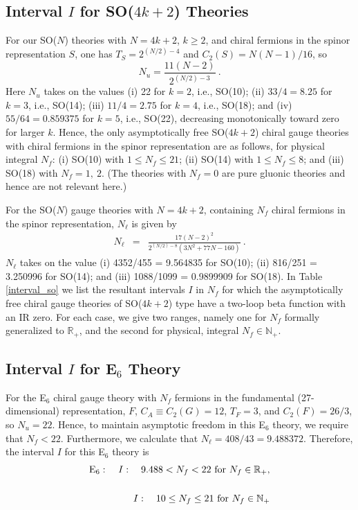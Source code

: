 \documentclass[prd,twocolumn,nofootinbib,amsfonts,amssymb]{revtex4}
\newcommand{\beq}{\begin{equation}}
\newcommand{\eeq}{\end{equation}}
\newcommand{\beqs}{\begin{eqnarray}}
\newcommand{\eeqs}{\end{eqnarray}}
\begin{document}

\subsection{Interval $I$ for SO($4k+2$) Theories} 

For our SO($N$) theories with $N=4k+2$, $k \ge 2$, and chiral fermions in the
spinor representation $S$, one has $T_S = 2^{(N/2)-4}$ and 
$C_2(S) = N(N-1)/16$, so 
%
\beq
N_u = \frac{11(N-2)}{2^{(N/2)-3}} \ . 
\label{nu}
\eeq
%
Here $N_u$ takes on the values (i) 22 for $k=2$, i.e., SO(10); (ii) $33/4=8.25$
for $k=3$, i.e., SO(14); (iii) $11/4=2.75$ for $k=4$, i.e., SO(18); and (iv)
$55/64=0.859375$ for $k=5$, i.e., SO(22), decreasing monotonically toward zero
for larger $k$.  Hence, the only asymptotically free SO($4k+2$) chiral gauge
theories with chiral fermions in the spinor representation are as follows, for
physical integral $N_f$: (i) SO(10) with $1 \le N_f \le 21$; (ii) SO(14) with
$1 \le N_f \le 8$; and (iii) SO(18) with $N_f = 1, \ 2$. (The theories with
$N_f=0$ are pure gluonic theories and hence are not relevant here.)

For the SO($N$) gauge theories with $N=4k+2$, containing $N_f$ chiral fermions 
in the spinor representation, $N_\ell$ is given by 
%
\beqs
N_\ell &=& \frac{17(N-2)^2}{2^{(N/2)-8}(3N^2+77N-160)} \ . 
\label{nfb2z_so}
\eeqs
%
$N_\ell$ takes on the value (i) 4352/455 = 9.564835 for SO(10); (ii) 816/251 =
3.250996 for SO(14); and (iii) 1088/1099 = 0.9899909 for SO(18).  In Table
\ref{interval_so} we list the resultant intervals $I$ in $N_f$ for which the
asymptotically free chiral gauge theories of SO($4k+2$) type have a two-loop
beta function with an IR zero.  For each case, we give two ranges, namely one
for $N_f$ formally generalized to ${\mathbb R}_+$, and
the second for physical, integral $N_f \in {\mathbb N}_+$.


\subsection{Interval $I$ for E$_6$ Theory} 

For the E$_6$ chiral gauge theory with $N_f$ fermions in the fundamental 
(27-dimensional) representation, $F$, $C_A \equiv C_2(G) = 12$, 
$T_F = 3$, and $C_2(F) = 26/3$, so $N_u = 22$. 
Hence, to maintain asymptotic freedom in this E$_6$ theory, we require that
$N_f < 22$.  Furthermore, we calculate that 
$N_{\ell} = 408/43 = 9.488372$. 
Therefore, the interval $I$ for this E$_6$ theory is 
%
\beqs
{\rm E}_6: && \ I: \quad 9.488 < N_f < 22 \ {\rm for} \ N_f \in {\mathbb R}_+,
\cr\cr
           && \ I: \quad 10 \le N_f \le 21 \ {\rm for} \ N_f \in {\mathbb N}_+
\label{interval_e6}
\eeqs
%
\end{document}
